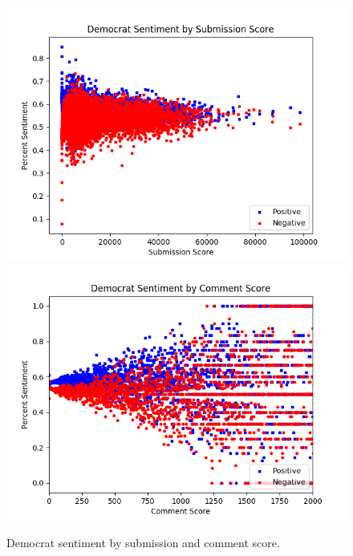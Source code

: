 \documentclass[12pt]{article}
\begin{document}
\begin{figure}[H]
                  \includegraphics[width=\linewidth]{plot5a_dem_sentiment_by_story.png}
        \endminipage\hfill
                  \includegraphics[width=\linewidth]{plot5b_dem_sentiment_by_comment.png}
        \endminipage
        \caption{Democrat sentiment by submission and comment score.}
\end{figure}
\end{document}

